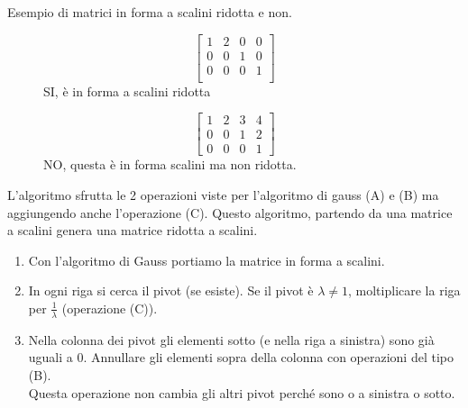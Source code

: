 \begin{example}
Esempio di matrici in forma a scalini ridotta e non.
\vspace{-10pt}
\begin{figure}[h!]
    \centering
    \begin{minipage}{.4\linewidth}
        \centering
        \[
            \begin{bmatrix}
            1 & 2 & 0 & 0\\
            0 & 0 & 1 & 0\\
            0 & 0 & 0 & 1\\
            \end{bmatrix}
        \]
        SI, è in forma a scalini ridotta
    \end{minipage}
    \hspace{.3cm}
    \begin{minipage}{.4\linewidth}
        \centering
        \[
            \begin{bmatrix}
            1 & 2 & 3 & 4\\
            0 & 0 & 1 & 2\\
            0 & 0 & 0 & 1
            \end{bmatrix}
        \]
        NO, questa è in forma scalini ma non ridotta.
    \end{minipage}
\end{figure}
\end{example}
\newpage
\begin{definition}
L'algoritmo sfrutta le 2 operazioni viste per l'algoritmo di gauss (A) e (B) ma aggiungendo anche l'operazione (C). Questo algoritmo, partendo da una matrice a scalini genera una matrice ridotta a scalini.
\begin{enumerate}
    \item Con l'algoritmo di Gauss portiamo la matrice in forma a scalini.
    \item In ogni riga si cerca il pivot (se esiste). Se il pivot è $\lambda \neq 1$, moltiplicare la riga per $\frac{1}{\lambda}$ (operazione (C)).
    \item Nella colonna dei pivot gli elementi sotto (e nella riga a sinistra) sono già uguali a 0. Annullare gli elementi sopra della colonna con operazioni del tipo (B).\\
    Questa operazione non cambia gli altri pivot perché sono o a sinistra o sotto.
\end{enumerate}
\end{definition}


